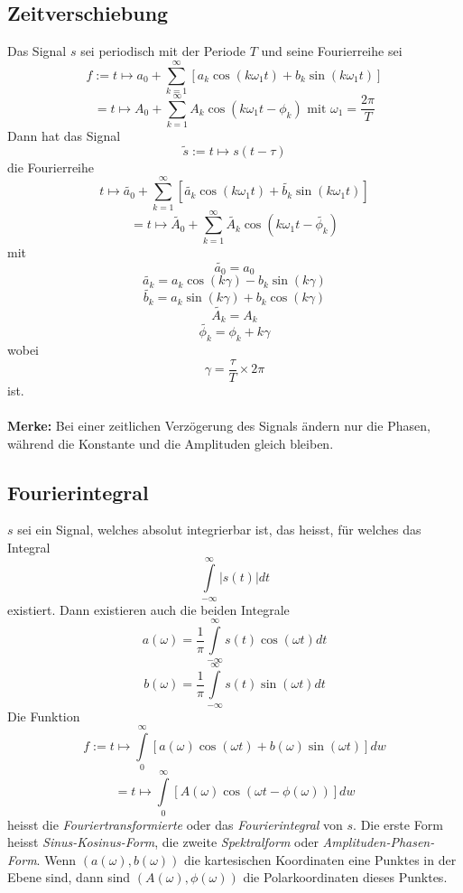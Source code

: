 \documentclass[10pt,a4paper]{scrartcl}
\begin{document}
\subsection{Zeitverschiebung}

Das Signal $s$ sei periodisch mit der Periode $T$ und seine Fourierreihe sei
$$f:= t \mapsto a_0 + \sum_{k=1}^{\infty} \left[a_k\cos(k\omega_1t)
    + b_k\sin(k\omega_1t)\right]$$
$$= t \mapsto A_0 + \sum_{k=1}^{\infty} A_k \cos(k\omega_1t - \phi_k)
    \textrm{ mit } \omega_1 = \frac{2\pi}{T}$$
Dann hat das Signal
$$\tilde{s} := t \mapsto s(t-\tau)$$
die Fourierreihe
$$t \mapsto \widetilde{a_0} + \sum_{k=1}^{\infty} \left[\widetilde{a_k}
    \cos(k\omega_1t) + \widetilde{b_k}\sin(k\omega_1t)\right]$$
$$= t \mapsto \widetilde{A_0} + \sum_{k=1}^{\infty}
    \widetilde{A_k}\cos(k\omega_1t - \widetilde{\phi_k})$$
mit
$$\widetilde{a_0} = a_0$$
$$\widetilde{a_k} = a_k\cos(k\gamma) - b_k\sin(k\gamma)$$
$$\widetilde{b_k} = a_k\sin(k\gamma) + b_k\cos(k\gamma)$$
$$\widetilde{A_k} = A_k$$
$$\widetilde{\phi_k} = \phi_k + k\gamma$$
wobei
$$\gamma = \frac{\tau}{T} \times 2\pi$$
ist.\\\\
\textbf{Merke:} Bei einer zeitlichen Verzögerung des Signals ändern nur die
Phasen, während die Konstante und die Amplituden gleich bleiben.


\subsection{Fourierintegral}

$s$ sei ein Signal, welches absolut integrierbar ist, das heisst, für welches
das Integral
$$\int\limits_{-\infty}^{\infty} |s(t)|dt$$
existiert. Dann existieren auch die beiden Integrale
$$a(\omega) = \frac{1}{\pi} \int\limits_{-\infty}^{\infty} s(t)
    \cos(\omega t)dt$$
$$b(\omega) = \frac{1}{\pi} \int\limits_{-\infty}^{\infty} s(t)
    \sin(\omega t)dt$$
Die Funktion
$$f := t \mapsto \int\limits_0^{\infty} \left[ a(\omega) \cos(\omega t)
    + b(\omega) \sin(\omega t)\right]dw$$
$$=t \mapsto \int\limits_0^{\infty} \left[A(\omega) \cos(\omega t
    - \phi (\omega))\right]dw$$
heisst die \emph{Fouriertransformierte} oder das \emph{Fourierintegral} von
$s$. Die erste Form heisst \emph{Sinus-Kosinus-Form}, die zweite
\emph{Spektralform} oder \emph{Amplituden-Phasen-Form}. Wenn
$(a(\omega), b(\omega))$ die kartesischen Koordinaten eine Punktes in der Ebene
sind, dann sind $(A(\omega), \phi(\omega))$ die Polarkoordinaten dieses Punktes.
\end{document}
